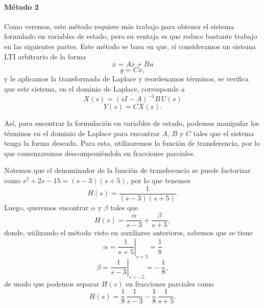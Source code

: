 \documentclass[
  11pt,
  letterpaper,
   addpoints,
   answers
  ]{exam}
\begin{document}
\begin{questions}
\begin{solution}
\paragraph{Método 2}
Como veremos, este método requiere más trabajo para obtener el sistema formulado en variables de estado, pero su ventaja es que reduce bastante trabajo en las siguientes partes. Este método se basa en que, si consideramos un sistema LTI arbitrario de la forma
\begin{equation}
\dot{x} = A x + B u
\end{equation}
\begin{equation}
y = C x,
\end{equation}
y le aplicamos la transformada de Laplace y reordenamos términos, se verifica que este sistema, en el dominio de Laplace, corresponde a
\begin{equation}
X(s) = (sI - A)^{-1} B\, U(s)
\end{equation}
\begin{equation}
Y(s) = C X(s).
\end{equation}

Así, para encontrar la formulación en variables de estado, podemos manipular los términos en el dominio de Laplace para encontrar $A$, $B$ y $C$ tales que el sistema tenga la forma deseada. Para esto, utilizaremos la función de transferencia, por lo que comenzaremos descomponiéndola en fracciones parciales.

Notemos que el denominador de la función de transferencia se puede factorizar como $s^2 + 2s - 15 = (s-3)(s+5)$, por lo que tenemos
\begin{equation}
H(s) = \frac{1}{(s-3)(s+5)}.
\end{equation}
Luego, queremos encontrar $\alpha$ y $\beta$ tales que
\begin{equation}
H(s) = \frac{\alpha}{s-3} + \frac{\beta}{s+5},
\end{equation}
donde, utilizando el método visto en auxiliares anteriores, sabemos que se tiene
\begin{equation}
\alpha = \left.\frac{1}{s+5}\right|_{s=3} = \frac{1}{8}
\end{equation}
\begin{equation}
\beta = \left.\frac{1}{s-3}\right|_{s=-5} = -\,\frac{1}{8},
\end{equation}
de modo que podemos separar $H(s)$ en fracciones parciales como
\begin{equation}
H(s) = \frac{1}{8}\,\frac{1}{s-3} - \frac{1}{8}\,\frac{1}{s+5}.
\end{equation}


\end{solution}
\end{questions}
\end{document}
